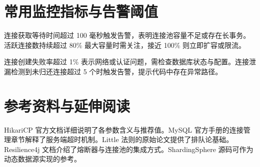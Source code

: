 \section{常用监控指标与告警阈值}
连接获取等待时间超过 100 毫秒触发告警，表明连接池容量不足或存在长事务。活跃连接数持续超过 80\%{} 最大容量时需关注，接近 100\%{} 则立即扩容或限流。\par
连接创建失败率超过 1\%{} 表示网络或认证问题，需检查数据库状态与配置。连接泄漏检测到未归还连接超过 5 个时触发告警，提示代码中存在异常路径。\par
\section{参考资料与延伸阅读}
HikariCP 官方文档详细说明了各参数含义与推荐值。MySQL 官方手册的连接管理章节解释了服务端超时机制。Little 法则的原始论文提供了排队论基础。Resilience4j 文档介绍了熔断器与连接池的集成方式。ShardingSphere 源码可作为动态数据源实现的参考。\par
